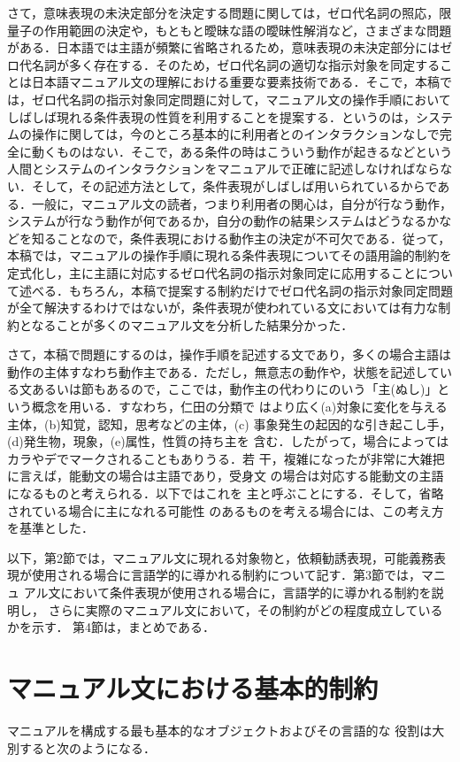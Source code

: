 さて，意味表現の未決定部分を決定する問題に関しては，ゼロ代名詞の照応，限
量子の作用範囲の決定や，もともと曖昧な語の曖昧性解消など，さまざまな問題
がある．日本語では主語が頻繁に省略されるため，意味表現の未決定部分にはゼ
ロ代名詞が多く存在する．そのため，ゼロ代名詞の適切な指示対象を同定するこ
とは日本語マニュアル文の理解における重要な要素技術である．そこで，本稿で
は，ゼロ代名詞の指示対象同定問題に対して，マニュアル文の操作手順において
しばしば現れる条件表現の性質を利用することを提案する．というのは，システ
ムの操作に関しては，今のところ基本的に利用者とのインタラクションなしで完
全に動くものはない．そこで，ある条件の時はこういう動作が起きるなどという
人間とシステムのインタラクションをマニュアルで正確に記述しなければならな
い．そして，その記述方法として，条件表現がしばしば用いられているからであ
る．一般に，マニュアル文の読者，つまり利用者の関心は，自分が行なう動作，
システムが行なう動作が何であるか，自分の動作の結果システムはどうなるかな
どを知ることなので，条件表現における動作主の決定が不可欠である．従って，
本稿では，マニュアルの操作手順に現れる条件表現についてその語用論的制約を
定式化し，主に主語に対応するゼロ代名詞の指示対象同定に応用することについ
て述べる．もちろん，本稿で提案する制約だけでゼロ代名詞の指示対象同定問題
が全て解決するわけではないが，条件表現が使われている文においては有力な制
約となることが多くのマニュアル文を分析した結果分かった．

さて，本稿で問題にするのは，操作手順を記述する文であり，多くの場合主語は
動作の主体すなわち動作主である．ただし，無意志の動作や，状態を記述してい
る文あるいは節もあるので，ここでは，動作主の代わりに\cite{仁田:日本語の
格を求めて}のいう「主(ぬし)」という概念を用いる．すなわち，仁田の分類で
はより広く(a)対象に変化を与える主体，(b)知覚，認知，思考などの主体，(c)
事象発生の起因的な引き起こし手，(d)発生物，現象，(e)属性，性質の持ち主を
含む．したがって，場合によってはカラやデでマークされることもありうる．若
干，複雑になったが非常に大雑把に言えば，能動文の場合は主語であり，受身文
の場合は対応する能動文の主語になるものと考えられる．以下ではこれを{\dg 
主}と呼ぶことにする．そして，省略されている場合に{\dg 主}になれる可能性
のあるものを考える場合には、この考え方を基準とした．

以下，第2節では，マニュアル文に現れる対象物と，依頼勧誘表現，可能義務表
現が使用される場合に言語学的に導かれる制約について記す．第3節では，マニュ
アル文において条件表現が使用される場合に，言語学的に導かれる制約を説明し，
さらに実際のマニュアル文において，その制約がどの程度成立しているかを示す．
第4節は，まとめである．

\section{マニュアル文における基本的制約}
マニュアルを構成する最も基本的なオブジェクトおよびその言語的な
役割は大別すると次のようになる．

